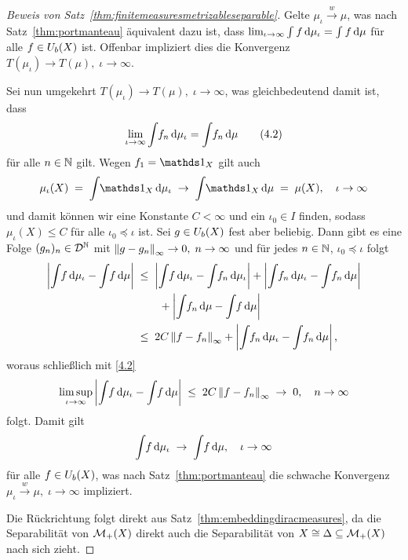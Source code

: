 \documentclass[../main/main.tex]{subfiles}
\begin{document}
\begin{proof}[Beweis von Satz~\ref{thm:finitemeasuresmetrizableseparable}]
		Gelte $\mu_\iota \xrightarrow{w} \mu$, was nach Satz~\ref{thm:portmanteau} äquivalent dazu ist, dass $\lim_{\iota \to \infty} \int_{} \, f \, \mathrm{d}\mu_\iota = \int_{} \, f \, \mathrm{d}\mu$ für alle 
		$f \in U_b(X)$ ist. Offenbar impliziert dies die Konvergenz $T(\mu_\iota) \to T(\mu), \; \iota \to \infty$.
		
		Sei nun umgekehrt $T(\mu_\iota) \to T(\mu), \; \iota \to \infty$, was gleichbedeutend damit ist, dass 
		\[ \lim_{\iota \to \infty} \int_{} \, f_n \, \mathrm{d}\mu_\iota = \int_{} \, f_n \, \mathrm{d}\mu \label{4.2} \tag{4.2} \] 
		für alle $n \in \mathbb{N}$ gilt.
		Wegen $f_1 = \indfct_X$ gilt auch
		\[ \mu_\iota(X) \; = \; \measureint{}{\indfct_X}{\mu_\iota} \; \to \; \measureint{}{\indfct_X}{\mu} \; = \; \mu(X), \quad \iota \to \infty \]
		und damit können wir eine Konstante $C < \infty$ und ein $\iota_0 \in I$ finden, sodass $\mu_\iota(X) \leq C$ für alle $\iota_0 \preceq \iota$ ist.
		Sei $g \in U_b(X)$ fest aber beliebig. Dann gibt es eine Folge $(g_n)_n \in \mathcal{D}^{\mathbb{N}}$ mit $\left\lVert g - g_n\right\rVert_\infty \to 0, \; n \to \infty$ und für jedes $n \in \mathbb{N}$, $\iota_0 \preceq \iota$ folgt
		\begin{align*}
			\left| \int_{} \, f \, \mathrm{d}\mu_\iota - \int_{} \, f \, \mathrm{d}\mu \right| \; &\leq \; 
			\left| \int_{} \, f \, \mathrm{d}\mu_\iota - \int_{} \, f_n \, \mathrm{d}\mu_\iota \right| + 
			\left| \int_{} \, f_n \, \mathrm{d}\mu_\iota - \int_{} \, f_n \, \mathrm{d}\mu \right| \\
			& \qquad + 
			\left| \int_{} \, f_n \, \mathrm{d}\mu - \int_{} \, f \, \mathrm{d}\mu \right| \\
			&\leq \; 2 C \left\lVert f - f_n\right\rVert_\infty + \left| \int_{} \, f_n \, \mathrm{d}\mu_\iota - 
			\int_{} \, f_n \, \mathrm{d}\mu \right| \text{,}
		\end{align*}
		woraus schließlich mit \eqref{4.2}
		\[ \limsup_{\iota \to \infty} \left| \int_{} \, f \, \mathrm{d}\mu_\iota - \int_{} \, f \, \mathrm{d}\mu \right| \; \leq \; 2 C \left\lVert f - f_n\right\rVert_\infty \; \to \; 0, \quad n \to \infty \]
		folgt. Damit gilt 
		\[ \int_{} \, f \, \mathrm{d}\mu_\iota \; \to \; \int_{} \, f \, \mathrm{d}\mu, \quad \iota \to \infty \]
		für alle $f \in U_b(X)$, was nach Satz~\ref{thm:portmanteau} die schwache Konvergenz $\mu_\iota \xrightarrow{w} \mu, \; \iota \to \infty$ impliziert.
		
		Die Rückrichtung folgt direkt aus Satz~\ref{thm:embeddingdiracmeasures}, da die Separabilität von $\mathcal{M}_{+}(X)$ direkt auch die Separabilität von $X \cong \Delta \subseteq \mathcal{M}_{+}(X)$ nach sich zieht.
	\end{proof}
\end{document}
